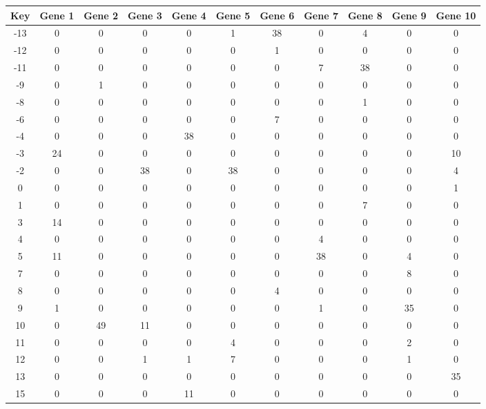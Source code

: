 \begin{tabular}{|c|c|c|c|c|c|c|c|c|c|c|}
\hline
Key & Gene 1 & Gene 2 & Gene 3 & Gene 4 & Gene 5 & Gene 6 & Gene 7 & Gene 8 & Gene 9 & Gene 10 \\
\hline
-13 & 0 & 0 & 0 & 0 & 1 & 38 & 0 & 4 & 0 & 0 \\
-12 & 0 & 0 & 0 & 0 & 0 & 1 & 0 & 0 & 0 & 0 \\
-11 & 0 & 0 & 0 & 0 & 0 & 0 & 7 & 38 & 0 & 0 \\
-9 & 0 & 1 & 0 & 0 & 0 & 0 & 0 & 0 & 0 & 0 \\
-8 & 0 & 0 & 0 & 0 & 0 & 0 & 0 & 1 & 0 & 0 \\
-6 & 0 & 0 & 0 & 0 & 0 & 7 & 0 & 0 & 0 & 0 \\
-4 & 0 & 0 & 0 & 38 & 0 & 0 & 0 & 0 & 0 & 0 \\
-3 & 24 & 0 & 0 & 0 & 0 & 0 & 0 & 0 & 0 & 10 \\
-2 & 0 & 0 & 38 & 0 & 38 & 0 & 0 & 0 & 0 & 4 \\
0 & 0 & 0 & 0 & 0 & 0 & 0 & 0 & 0 & 0 & 1 \\
1 & 0 & 0 & 0 & 0 & 0 & 0 & 0 & 7 & 0 & 0 \\
3 & 14 & 0 & 0 & 0 & 0 & 0 & 0 & 0 & 0 & 0 \\
4 & 0 & 0 & 0 & 0 & 0 & 0 & 4 & 0 & 0 & 0 \\
5 & 11 & 0 & 0 & 0 & 0 & 0 & 38 & 0 & 4 & 0 \\
7 & 0 & 0 & 0 & 0 & 0 & 0 & 0 & 0 & 8 & 0 \\
8 & 0 & 0 & 0 & 0 & 0 & 4 & 0 & 0 & 0 & 0 \\
9 & 1 & 0 & 0 & 0 & 0 & 0 & 1 & 0 & 35 & 0 \\
10 & 0 & 49 & 11 & 0 & 0 & 0 & 0 & 0 & 0 & 0 \\
11 & 0 & 0 & 0 & 0 & 4 & 0 & 0 & 0 & 2 & 0 \\
12 & 0 & 0 & 1 & 1 & 7 & 0 & 0 & 0 & 1 & 0 \\
13 & 0 & 0 & 0 & 0 & 0 & 0 & 0 & 0 & 0 & 35 \\
15 & 0 & 0 & 0 & 11 & 0 & 0 & 0 & 0 & 0 & 0 \\
\hline
\end{tabular}